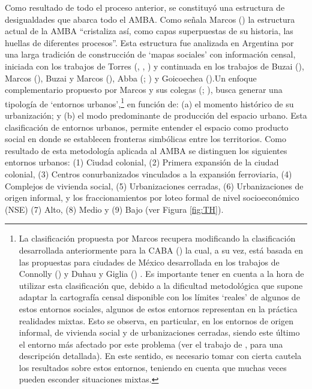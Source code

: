 \documentclass[
  spanish,
  a4paper,%
  chapterprefix=true,%
  DIV=calc,%
  twoside]{scrbook}%
\begin{document}
Como resultado de todo el proceso anterior, se constituyó una estructura
de desigualdades que abarca todo el AMBA. Como señala Marcos () la estructura actual de la AMBA ``cristaliza así, como capas
superpuestas de su historia, las huellas de diferentes procesos''. Esta
estructura fue analizada en Argentina por una larga tradición de
construcción de `mapas sociales' con información censal, iniciada con
los trabajos de Torres (, , ) y
continuada en los trabajos de Buzai (), Marcos (), Buzai y Marcos (), Abba
(; ) y Goicoechea ().Un
enfoque complementario propuesto por Marcos y sus colegas (; ), busca generar una tipología de `entornos
urbanos',\footnote{La clasificación propuesta por Marcos recupera
  modificando la clasificación desarrollada anteriormente para la CABA
  () la cual, a su vez, está basada en las propuestas para
  ciudades de México desarrollada en los trabajos de Connolly () y
  Duhau y Giglia () . Es importante tener en cuenta a la hora de utilizar
  esta clasificación que, debido a la dificultad metodológica que
  supone adaptar la cartografía censal disponible con los límites
  `reales' de algunos de estos entornos sociales, algunos de estos
  entornos representan en la práctica realidades mixtas. Esto se
  observa, en particular, en los entornos de origen informal, de
  vivienda social y de urbanizaciones cerradas, siendo este último el
  entorno más afectado por este problema (ver el trabajo de , para una descripción detallada). En este
  sentido, es necesario tomar con cierta cautela los resultados sobre
  estos entornos, teniendo en cuenta que muchas veces pueden esconder
  situaciones mixtas.} en función de: (a) el momento histórico de su
urbanización; y (b) el modo predominante de producción del espacio
urbano. Esta clasificación de entornos urbanos, permite entender el
espacio como producto social en donde se establecen fronteras simbólicas
entre los territorios. Como resultado de esta metodología aplicada al
AMBA se distinguen los siguientes entornos urbanos: (1) Ciudad colonial,
(2) Primera expansión de la ciudad colonial, (3) Centros conurbanizados
vinculados a la expansión ferroviaria, (4) Complejos de vivienda social,
(5) Urbanizaciones cerradas, (6) Urbanizaciones de origen informal, y
los fraccionamientos por loteo formal de nivel socioeconómico (NSE) (7)
Alto, (8) Medio y (9) Bajo (ver Figura \ref{fig:TH}).
\end{document}
